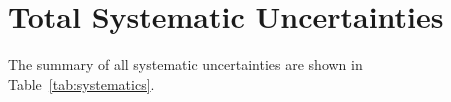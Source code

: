 \section{Total Systematic Uncertainties}
\label{sec:sys-total}

The summary of all systematic uncertainties are shown in Table~\ref{tab:systematics}.


